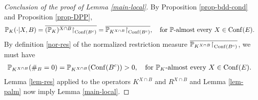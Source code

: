 \documentclass[12pt]{paper}
\numberwithin{theorem}{section}
\numberwithin{figure}{section}
\numberwithin{equation}{section}
\begin{document}
\begin{proof}[ Conclusion of the proof of Lemma \ref{main-local}]
By Proposition \ref{prop-bdd-cond} and Proposition \ref{prop-DPP},
\[
\mathbb{P}_K(\cdot | X, B) = \overline{(\mathbb{P}_K)^{X\cap B}\mathord{\upharpoonright}_{\mathrm{Conf}(B^c)}} =  \overline{\mathbb{P}_{K^{X\cap B}}\mathord{\upharpoonright}_{\mathrm{Conf}(B^c)}}, \quad \text{for $\mathbb{P}$-almost every $X \in \mathrm{Conf}(E)$}.
\]
By definition \eqref{nor-res} of the normalized restriction measure $\overline{\mathbb{P}_{K^{X\cap B}}\mathord{\upharpoonright}_{\mathrm{Conf}(B^c)}}$, we must have
\begin{align}\label{non-vanish-proba}
\mathbb{P}_{K^{X\cap B}} (\#_B = 0)  = \mathbb{P}_{K^{X\cap B}} ( \mathrm{Conf}(B^c)) >0, \quad \text{for $\mathbb{P}_K$-almost every $X\in \mathrm{Conf}(E)$.}
\end{align}
Lemma \ref{lem-res} applied to the operators $K^{X\cap B}$ and $R^{X\cap B}$ and Lemma \ref{lem-palm} now imply Lemma \ref{main-local}.
\end{proof}
\end{document}
